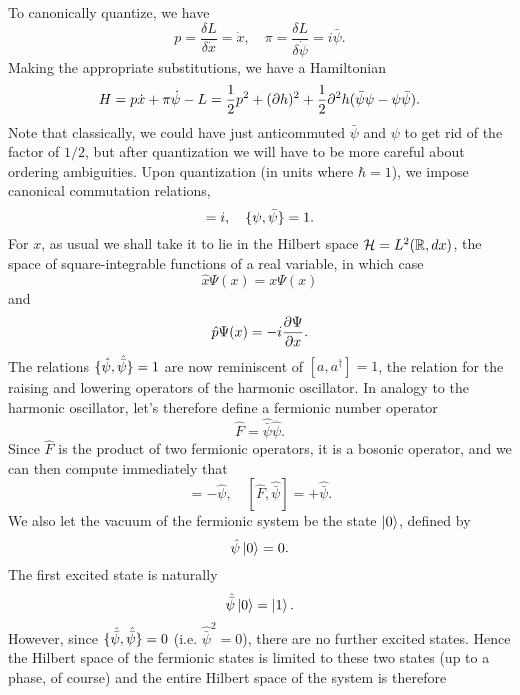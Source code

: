 To canonically quantize, we have
\begin{equation}
    p=\frac{\delta L}{\delta \dot x}=\dot x, \quad \pi = \frac{\delta L}{\delta \dot \psi}=i \bar \psi.
\end{equation}
Making the appropriate substitutions, we have a Hamiltonian
\begin{equation}
    H=p \dot x + \pi \dot \psi - L =\frac{1}{2} p^2 + (\p h)^2 + \frac{1}{2} \p^2 h (\bar \psi \psi - \psi \bar \psi).
\end{equation}
Note that classically, we could have just anticommuted $\bar \psi$ and $\psi$ to get rid of the factor of $1/2$, but after quantization we will have to be more careful about ordering ambiguities. Upon quantization (in units where $\hbar =1$), we impose canonical commutation relations,
\begin{equation}
    [x,p]= i, \quad \set{\psi,\bar \psi}=1.
\end{equation}
For $x$, as usual we shall take it to lie in the Hilbert space $\cH= L^2(\RR,dx)$, the space of square-integrable functions of a real variable, in which case
\begin{equation*}
    \hat x \Psi(x)=x \Psi(x)
\end{equation*}
and
\begin{equation*}
    \hat p \Psi(x)=-i\P{\Psi}{x}.
\end{equation*}
The relations $\set{\hat \psi,\hat{\bar \psi}}=1$ are now reminiscent of $[a,a^\dagger]=1$, the relation for the raising and lowering operators of the harmonic oscillator. In analogy to the harmonic oscillator, let's therefore define a fermionic number operator
\begin{equation}
    \hat F = \hat{\bar \psi}\hat \psi.
\end{equation}
Since $\hat F$ is the product of two fermionic operators, it is a bosonic operator, and we can then compute immediately that
\begin{equation}
    [\hat F,\hat \psi]=-\hat \psi,\quad [\hat F,\hat{\bar \psi}]=+\hat{\bar \psi}.
\end{equation}
We also let the vacuum of the fermionic system be the state $\ket{0}$, defined by
\begin{equation}
    \hat \psi \ket{0}=0.
\end{equation}
The first excited state is naturally
\begin{equation*}
    \hat{\bar \psi}\ket{0}=\ket{1}.
\end{equation*}
However, since $\set{\hat {\bar \psi},\hat {\bar \psi}}=0$ (i.e. $\hat {\bar \psi}^2=0$), there are no further excited states. Hence the Hilbert space of the fermionic states is limited to these two states (up to a phase, of course) and the entire Hilbert space of the system is therefore
